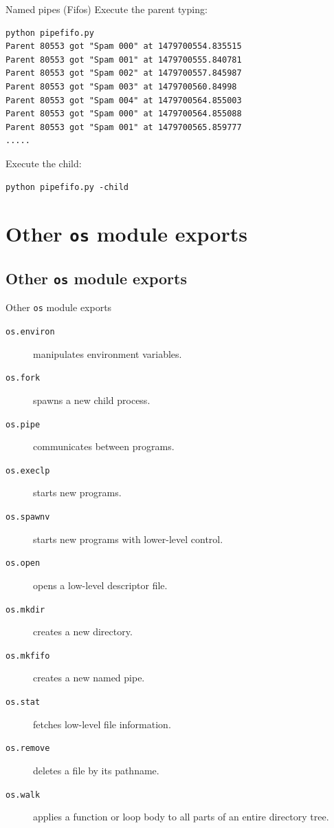 \documentclass[xcolor=dvipsnames, 10pt, presentation,aspectratio=169]{beamer}
\begin{document}
\begin{frame}[label={sec:org6eb55a7},fragile]{Named pipes (Fifos)}
 Execute the parent typing:
\lstset{language=sh,label= ,caption= ,captionpos=b,numbers=none}
\begin{lstlisting}
python pipefifo.py
Parent 80553 got "Spam 000" at 1479700554.835515
Parent 80553 got "Spam 001" at 1479700555.840781
Parent 80553 got "Spam 002" at 1479700557.845987
Parent 80553 got "Spam 003" at 1479700560.84998
Parent 80553 got "Spam 004" at 1479700564.855003
Parent 80553 got "Spam 000" at 1479700564.855088
Parent 80553 got "Spam 001" at 1479700565.859777
.....
\end{lstlisting}
Execute the child:
\lstset{language=sh,label= ,caption= ,captionpos=b,numbers=none}
\begin{lstlisting}
python pipefifo.py -child
\end{lstlisting}
\end{frame}

\section{Other \texttt{os} module exports}
\label{sec:orgb51522d}
\subsection{Other \texttt{os} module exports}
\label{sec:orga5ea30a}
\begin{frame}[label={sec:orga7f7c5d},fragile]{Other \texttt{os} module exports}
 \begin{description}
\item[{\texttt{os.environ}}] manipulates environment variables.
\item[{\texttt{os.fork}}] spawns a new child process.
\item[{\texttt{os.pipe}}] communicates between programs.
\item[{\texttt{os.execlp}}] starts new programs.
\item[{\texttt{os.spawnv}}] starts new programs with lower-level control.
\item[{\texttt{os.open}}] opens a low-level descriptor file.
\item[{\texttt{os.mkdir}}] creates a new directory.
\item[{\texttt{os.mkfifo}}] creates a new named pipe.
\item[{\texttt{os.stat}}] fetches low-level file information.
\item[{\texttt{os.remove}}] deletes a file by its pathname.
\item[{\texttt{os.walk}}] applies a function or loop body to all parts of an entire
directory tree.
\end{description}
\end{frame}
\begin{frame}[label={sec:org7734c19}]{}
\end{frame}
\end{document}

